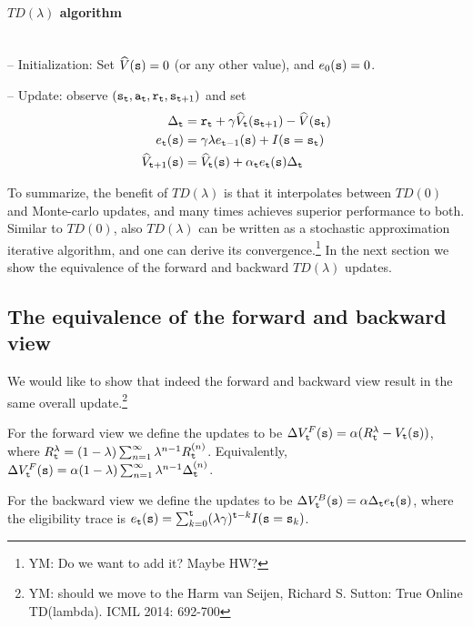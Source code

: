 \paragraph{$TD(\lambda)$ algorithm}\ \\

 -- Initialization: Set $\widehat{V}({\tt s})=0$ (or any other value), and
 $e_0({\tt s})=0$.

 -- Update: observe $({\tt s}_{\tt t},{\tt a}_{\tt t},{\tt r}_{\tt t},{\tt s}_{{\tt t}+1})$ and set
\begin{align*}
\Delta_{\tt t} &= {\tt r}_{\tt t} +\gamma \widehat{V}_{\tt t}({\tt s}_{{\tt t}+1})-\widehat{V}({\tt s}_{\tt t})\\
e_{\tt t}({\tt s}) &= \gamma\lambda e_{{\tt t}-1}({\tt s})+I({\tt s}={\tt s}_{\tt t})\\
\widehat{V}_{{\tt t}+1}({\tt s}) &=
\widehat{V}_{\tt t}({\tt s})+\alpha_{\tt t} e_{\tt t}
({\tt s})\Delta_{\tt t}
\end{align*}

 To summarize, the
benefit of $TD(\lambda)$ is that it interpolates between $TD(0)$ and
Monte-carlo updates, and many times achieves superior performance to
both.
%
Similar to $TD(0)$, also  $TD(\lambda)$ can be written as a
stochastic approximation iterative algorithm, and one can derive its convergence.\footnote{YM: Do we want to add it? Maybe HW?}
%
In the next section we show the equivalence of the forward and
backward $TD(\lambda)$ updates.
%

\subsection{The equivalence of the forward and backward view}

We would like to show that indeed the forward and backward view result in the same overall update.\footnote{YM: should we move to the Harm van Seijen, Richard S. Sutton: True Online TD(lambda). ICML 2014: 692-700}

For the forward view we define the updates to be
$\Delta V^F_{\tt t}({\tt s})=\alpha(R^\lambda_{\tt t}-V_{\tt t}({\tt s}))$,
where $R^\lambda_{\tt t}=(1-\lambda)\sum_{n=1}^\infty
\lambda^{n-1}R_{\tt t}^{(n)}$. Equivalently,
$\Delta V^F_{\tt t}({\tt s})=\alpha (1-\lambda)\sum_{n=1}^\infty \lambda^{n-1}\Delta_{\tt t} ^{(n)}$.


For the backward view we define the updates to be
$\Delta V^B_{\tt t}({\tt s})=\alpha\Delta_{\tt t} e_{\tt t}({\tt s})$,
where the eligibility trace is
$e_{\tt t}({\tt s})=\sum_{k=0}^{\tt t}(\lambda\gamma)^{{\tt t}-k}I({\tt s}={\tt s}_k)$.

